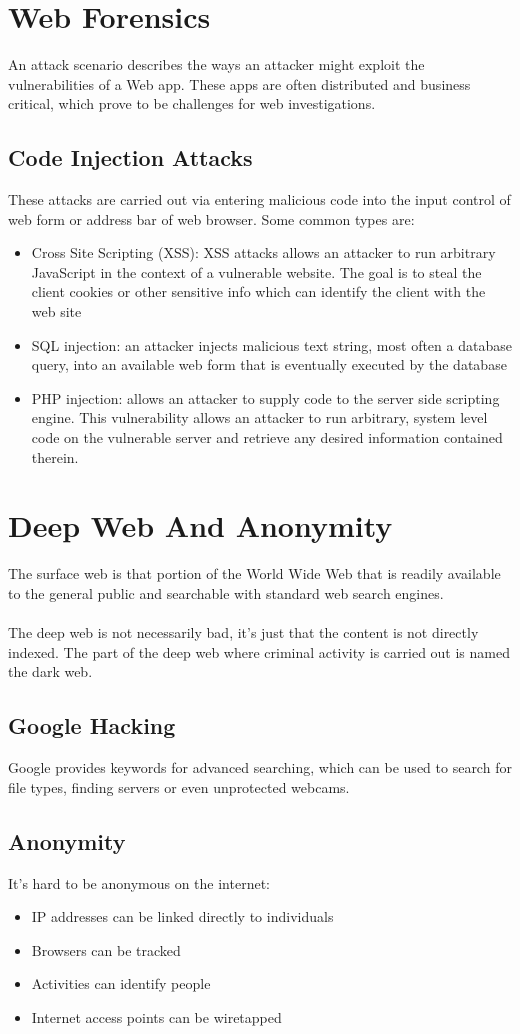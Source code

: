 \documentclass[10pt,a4paper]{report}
\begin{document}
\section{Web Forensics}
An attack scenario describes the ways an attacker might exploit the vulnerabilities of a Web app. These apps are often distributed and business critical, which prove to be challenges for web investigations.
\subsection{Code Injection Attacks}
These attacks are carried out via entering malicious code into the input control of web form or address bar of web browser. Some common types are:
\begin{itemize}
\item Cross Site Scripting (XSS): XSS attacks allows an attacker to run arbitrary JavaScript in the context of a vulnerable website. The goal is to steal the client cookies or other sensitive info which can identify the client with the web site
\item SQL injection: an attacker injects malicious text string, most often a database query, into an available web form that is eventually executed by the database
\item PHP injection: allows an attacker to supply code to the server side scripting engine. This vulnerability allows an attacker to run arbitrary, system level code on the vulnerable server and retrieve any desired information contained therein.
\end{itemize}
\section{Deep Web And Anonymity}
The surface web is that portion of the World Wide Web that is readily available to the general public and searchable with standard web search engines.\\
\\
The deep web is not necessarily bad, it’s just that the content is not directly indexed. The part of the deep web where criminal activity is carried out is named the dark web.
\subsection{Google Hacking}
Google provides keywords for advanced searching, which can be used to search for file types, finding servers or even unprotected webcams.
\subsection{Anonymity}
It's hard to be anonymous on the internet:
\begin{itemize}
\item IP addresses can be linked directly to individuals
\item Browsers can be tracked
\item Activities can identify people
\item Internet access points can be wiretapped
\end{itemize}
\end{document}
